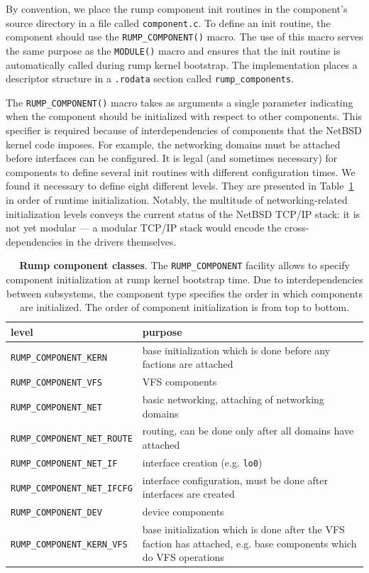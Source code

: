 By convention, we place the rump component init routines in the
component's source directory in a file called \texttt{component.c}.
To define an init routine,  the component should use the
\verb+RUMP_COMPONENT()+ macro.  The use of this macro serves the
same purpose as the \verb+MODULE()+ macro and ensures that the init
routine is automatically called during rump kernel bootstrap.
The implementation places a descriptor structure in a \texttt{.rodata}
section called \verb+rump_components+.

The \verb+RUMP_COMPONENT()+ macro takes as arguments a single
parameter indicating when the component should be initialized
with respect to other components.
This specifier is required because of interdependencies of components
that the NetBSD kernel code imposes.  For example, the networking
domains must be attached before interfaces can be configured.  It
is legal (and sometimes necessary) for components to define several init
routines with different configuration times.  We found it necessary
to define eight different levels.  They are presented in
Table~\ref{tab:compinit} in order of runtime initialization.  Notably, the
multitude of networking-related initialization levels conveys the
current status of the NetBSD TCP/IP stack: it is not yet modular --- a
modular TCP/IP stack would encode the cross-dependencies in the
drivers themselves.

\begin{table}
\begin{tabular}{|l|p{8cm}|}
\hline
level & purpose \\
\hline
\hline
\verb+RUMP_COMPONENT_KERN+ & base initialization which is done before
	any factions are attached \\
\hline
\verb+RUMP_COMPONENT_VFS+ & VFS components \\
\hline
\verb+RUMP_COMPONENT_NET+ & basic networking, attaching of networking domains \\
\hline
\verb+RUMP_COMPONENT_NET_ROUTE+ & routing, can be done only after all
	domains have attached \\
\hline
\verb+RUMP_COMPONENT_NET_IF+ & interface creation (e.g. \texttt{lo0}) \\
\hline
\verb+RUMP_COMPONENT_NET_IFCFG+ & interface configuration, must be done after
	interfaces are created \\
\hline
\verb+RUMP_COMPONENT_DEV+ & device components \\
\hline
\verb+RUMP_COMPONENT_KERN_VFS+ & base initialization which is done
	after the VFS faction has attached, e.g. base components which
	do VFS operations \\
\hline
\end{tabular}
\caption[Rump component classes]{
\textbf{Rump component classes}.
The \texttt{RUMP\_COMPONENT} facility allows to specify component
initialization at rump kernel bootstrap time.  Due to interdependencies
between subsystems, the component type specifies the order in which
components are initialized.  The order of component initialization is from top
to bottom.
}
\label{tab:compinit}
\end{table}

